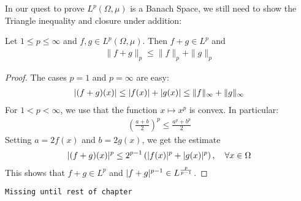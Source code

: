 In our quest to prove $L^{p}(\Omega,\mu)$ is a Banach Space, we still need to show the Triangle inequality and closure under addition:
\begin{cor}
  Let $1 \leq p \leq \infty$ and $f,g \in L^{p}(\Omega,\mu)$. Then $f + g \in L^{p}$ and 
  \begin{align*}
    \|f+g\|_{p} \leq \|f\|_p + \|g\|_p
  \end{align*}
\end{cor}
\begin{proof}
The cases $p = 1$ and $p = \infty$ are easy:
\begin{align*}
  \vert(f+g)(x)\vert \leq \vert f(x)\vert + \vert g(x)\vert \leq \|f\|_{\infty} + \|g\|_{\infty}
\end{align*}
For $1 < p < \infty$, we use that the function $x \mapsto x^{p}$ is convex. In particular:
\begin{align*}
  \left(\frac{a+b}{2}\right)^{p}
  \leq \frac{a^{p} + b^{p}}{2}
\end{align*}
Setting $a = 2f(x)$ and $b = 2g(x)$, we get the estimate
\begin{align*}
  \vert(f+g)(x)\vert^{p} \leq 2^{p-1} \left(
    \vert f(x)\vert^{p} + \vert g(x)\vert^{p}
  \right), \quad \forall x \in \Omega
\end{align*}
This shows that $f+g \in L^{p}$ and $\vert f+g\vert^{p-1} \in L^{\frac{p}{p-1}}$.
\end{proof}


\begin{center}
\texttt{Missing until rest of chapter}
\end{center}
